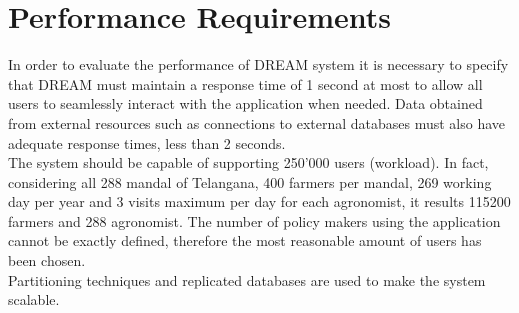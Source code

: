 \section{Performance Requirements}

In order to evaluate the performance of DREAM system it is necessary to specify that DREAM must maintain a response time of 1 second at most to allow all users to seamlessly interact with the application when needed. Data obtained from external resources such as connections to external databases must also have adequate response times, less than 2 seconds.\\
The system should be capable of supporting 250'000 users (workload). In fact, considering all 288 mandal of Telangana, 400 farmers per mandal, 269 working day per year and 3 visits maximum per day for each agronomist, it results 115200 farmers and 288 agronomist. The number of policy makers using the application cannot be exactly defined, therefore the most reasonable amount of users has been chosen.\\
Partitioning techniques and replicated databases are used to make the system scalable.